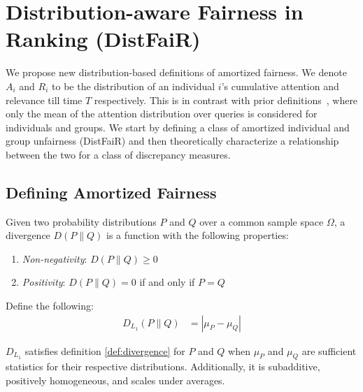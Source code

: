 \newcommand{\cummA}{A_i}
\newcommand{\cummR}{R_i}
\newcommand{\groupcummA}{A_{g_{k}}}
\newcommand{\groupcummR}{R_{g_{k}}}

\section{Distribution-aware Fairness in Ranking (DistFaiR)}
\label{sec:defining_amortized_distribution_fairness}


We propose new distribution-based definitions of amortized fairness. We denote $\cummA$ and $\cummR$ to be the distribution of an individual $i$'s cumulative attention and relevance till time $T$ respectively. This is in contrast with prior definitions~\cite{biega2018equity,singh2018fairness,morik2020controlling}, where only the mean of the attention distribution over queries is considered for individuals and groups. We start by defining a class of amortized individual and group unfairness (DistFaiR) and then theoretically characterize a relationship between the two for a class of discrepancy measures.

\subsection{Defining Amortized Fairness}
\begin{definition} \label{def:divergence}
Given two probability distributions $P$ and $Q$ over a common sample space $\Omega$, a divergence $D(P \| Q)$ is a function with the following properties:

\begin{enumerate}
    \item {\em Non-negativity}: $D(P \| Q) \geq 0$
    \item {\em Positivity}: $D(P \| Q) = 0$ if and only if $P = Q$
\end{enumerate}



\begin{lemma}
Define the following:
    \begin{align*}
        D_{L_1}(P \| Q) &= |\mu_P - \mu_Q|
    \end{align*}

    $D_{L_1}$ satisfies definition \ref{def:divergence} for $P$ and $Q$ when $\mu_P$ and $\mu_Q$ are sufficient statistics for their respective distributions. Additionally, it is subadditive, positively homogeneous, and scales under averages.
\end{lemma}


\end{definition}



